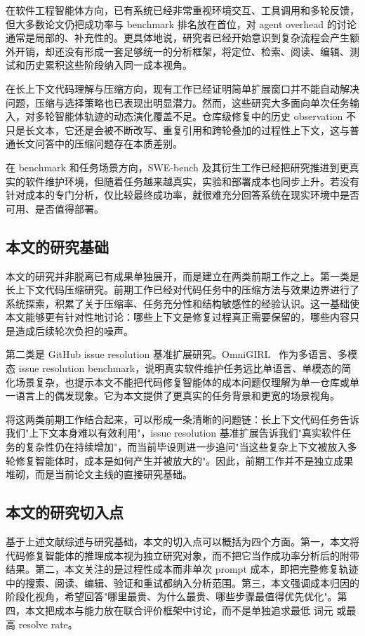在软件工程智能体方向，已有系统已经非常重视环境交互、工具调用和多轮反馈，但大多数论文仍把成功率与 benchmark 排名放在首位，对 agent overhead 的讨论通常是局部的、补充性的。更具体地说，研究者已经开始意识到复杂流程会产生额外开销，却还没有形成一套足够统一的分析框架，将定位、检索、阅读、编辑、测试和历史累积这些阶段纳入同一成本视角。

在长上下文代码理解与压缩方向，现有工作已经证明简单扩展窗口并不能自动解决问题，压缩与选择策略也已表现出明显潜力。然而，这些研究大多面向单次任务输入，对多轮智能体轨迹的动态演化覆盖不足。仓库级修复中的历史 observation 不只是长文本，它还是会被不断改写、重复引用和跨轮叠加的过程性上下文，这与普通长文问答中的压缩问题存在本质差别。

在 benchmark 和任务场景方向，SWE-bench 及其衍生工作已经把研究推进到更真实的软件维护环境，但随着任务越来越真实，实验和部署成本也同步上升。若没有针对成本的专门分析，仅比较最终成功率，就很难充分回答系统在现实环境中是否可用、是否值得部署。

\subsection{本文的研究基础}

本文的研究并非脱离已有成果单独展开，而是建立在两类前期工作之上。第一类是长上下文代码压缩研究。前期工作已经对代码任务中的压缩方法与效果边界进行了系统探索，积累了关于压缩率、任务充分性和结构敏感性的经验认识。这一基础使本文能够更有针对性地讨论：哪些上下文是修复过程真正需要保留的，哪些内容只是造成后续轮次负担的噪声。

第二类是 GitHub issue resolution 基准扩展研究。OmniGIRL~\cite{guo2025omnigirl} 作为多语言、多模态 issue resolution benchmark，说明真实软件维护任务远比单语言、单模态的简化场景复杂，也提示本文不能把代码修复智能体的成本问题仅理解为单一仓库或单一语言上的偶发现象。它为本文提供了更真实的任务背景和更宽的场景视角。

将这两类前期工作结合起来，可以形成一条清晰的问题链：长上下文代码任务告诉我们"上下文本身难以有效利用"，issue resolution 基准扩展告诉我们"真实软件任务的复杂性仍在持续增加"，而当前毕设则进一步追问"当这些复杂上下文被放入多轮修复智能体时，成本是如何产生并被放大的"。因此，前期工作并不是独立成果堆砌，而是当前论文主线的直接研究基础。

\subsection{本文的研究切入点}

基于上述文献综述与研究基础，本文的切入点可以概括为四个方面。第一，本文将代码修复智能体的推理成本视为独立研究对象，而不把它当作成功率分析后的附带结果。第二，本文关注的是过程性成本而非单次 prompt 成本，即把完整修复轨迹中的搜索、阅读、编辑、验证和重试都纳入分析范围。第三，本文强调成本归因的阶段化视角，希望回答"哪里最贵、为什么最贵、哪些步骤最值得优先优化"。第四，本文把成本与能力放在联合评价框架中讨论，而不是单独追求最低 词元 或最高 resolve rate。

